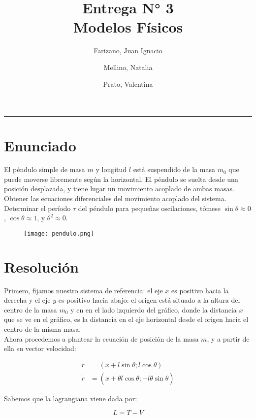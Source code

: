 \documentclass[11pt]{article}
\title{
  Entrega N° 3 \\
  \large Modelos Físicos
}
\author{
  Farizano, Juan Ignacio \\
  \and
  Mellino, Natalia \\
  \and
  Prato, Valentina
}
\date{}
\begin{document}
\maketitle
\noindent\rule{\textwidth}{1pt}

\section*{Enunciado}
El péndulo simple de masa $m$ y longitud $l$ está suspendido de la masa $m_0$
que puede moverse libremente según la horizontal. El péndulo se suelta desde una
posición desplazada, y tiene lugar un movimiento acoplado de ambas masas.
Obtener las ecuaciones diferenciales del movimiento acoplado del sistema.
Determinar el período $\tau$ del péndulo para pequeñas oscilaciones, tómese
 $\sin \theta \approx 0$, $\cos \theta \approx 1$, y $\theta^2 \approx 0$.

 \begin{figure}[h!]
  \begin{center}
    \texttt{[image: pendulo.png]}
  \end{center}
\end{figure}

\section*{Resolución}

Primero, fijamos nuestro sistema de referencia: el eje $x$ es positivo hacia
la derecha y el eje $y$ es positivo hacia abajo: el origen está situado a
la altura del centro de la masa $m_0$ y en en el lado izquierdo del gráfico,
donde la distancia $x$ que se ve en el gráfico, es la distancia en el eje horizontal
desde el origen hacia el centro de la misma masa. \\

Ahora procedemos a plantear la ecuación de posición de la masa $m$, y a partir
de ella su vector velocidad:

\begin{align*}
  r &= (x + l \sin \theta; l \cos \theta) \\
  \dot{r} &= (\dot{x} + \dot{\theta} l \cos \theta; -l \dot{\theta} \sin \theta)
\end{align*}

Sabemos que la lagrangiana viene dada por:

\begin{equation*}
  L = T - V
\end{equation*}
\end{document}
